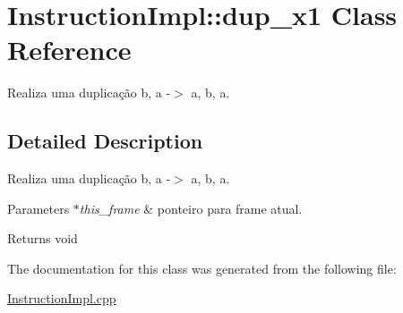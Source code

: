 \hypertarget{class_instruction_impl_1_1dup__x1}{}\section{Instruction\+Impl\+:\+:dup\+\_\+x1 Class Reference}
\label{class_instruction_impl_1_1dup__x1}


Realiza uma duplicação b, a -\/$>$ a, b, a.  




\subsection{Detailed Description}
Realiza uma duplicação b, a -\/$>$ a, b, a. 


\begin{DoxyParams}{Parameters}
{\em $\ast$this\+\_\+frame} & ponteiro para frame atual. \\
\hline
\end{DoxyParams}
\begin{DoxyReturn}{Returns}
void 
\end{DoxyReturn}


The documentation for this class was generated from the following file\+:\begin{DoxyCompactItemize}
\item 
\hyperlink{_instruction_impl_8cpp}{Instruction\+Impl.\+cpp}\end{DoxyCompactItemize}
